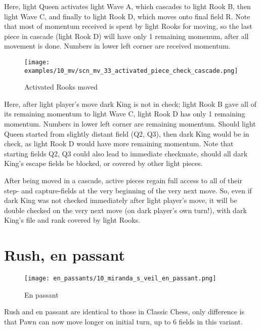 Here, light Queen activates light Wave A, which cascades to light Rook B, then light
Wave C, and finally to light Rook D, which moves onto final field R. Note that most
of momentum received is spent by light Rooks for moving, so the last piece in cascade
(light Rook D) will have only 1 remaining momenum, after all movement is done. Numbers
in lower left corner are received momentum.

\clearpage %

\vspace*{-2.1\baselineskip}
\noindent
\begin{figure}[!h]
\texttt{[image: examples/10\_mv/scn\_mv\_33\_activated\_piece\_check\_cascade.png]}
\caption{Activated Rooks moved}
\label{fig:scn_mv_33_activated_piece_check_cascade}
\end{figure}

Here, after light player's move dark King is not in check; light Rook B gave all of its
remaining momentum to light Wave C, light Rook D has only 1 remaining momentum. Numbers
in lower left corner are remaining momentum. Should light Queen started from slightly
distant field (Q2, Q3), then dark King would be in check, as light Rook D would have
more remaining momentum. Note that starting fields Q2, Q3 could also lead to immediate
checkmate, should all dark King's escape fields be blocked, or covered by other light
pieces.

After being moved in a cascade, active pieces regain full access to all of their step- and
capture-fields at the very beginning of the very next move. So, even if dark King was not
checked immediately after light player's move, it will be double checked on the very next
move (on dark player's own turn!), with dark King's file and rank covered by light Rooks.

\clearpage %

\section*{Rush, en passant}

\noindent
\begin{wrapfigure}[5]{l}{0.4\textwidth}
\centering
\texttt{[image: en\_passants/10\_miranda\_s\_veil\_en\_passant.png]}
\caption{En passant}
\label{fig:10_miranda_s_veil_en_passant}
\end{wrapfigure}
Rush and en passant are identical to those in Classic Chess, only difference
is that Pawn can now move longer on initial turn, up to 6 fields in this
variant.

